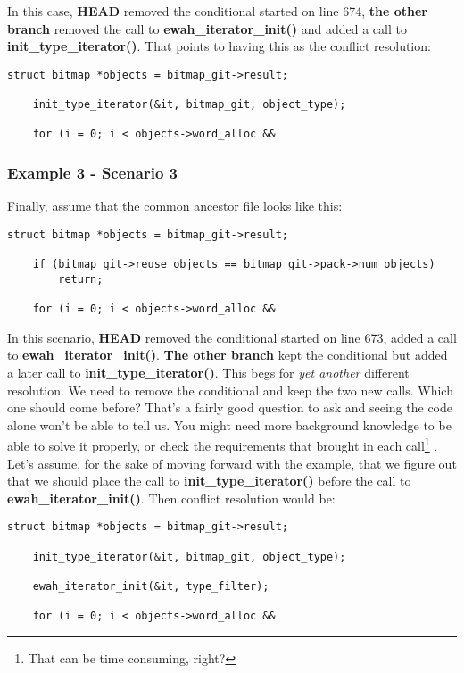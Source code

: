 In this case, {\bf HEAD} removed the conditional started on line 674, {\bf the other branch} removed the call to
{\bf ewah\_iterator\_init()} and added a call to {\bf init\_type\_iterator()}. That points to having this as the conflict resolution:

\begin{lstlisting}[style=c_style, firstnumber=671, caption={\bf example 3} - Scenario 2 - conflict resolution]
	struct bitmap *objects = bitmap_git->result;

	init_type_iterator(&it, bitmap_git, object_type);

	for (i = 0; i < objects->word_alloc &&
\end{lstlisting}

\subsubsection{Example 3 - Scenario 3}
Finally, assume that the common ancestor file looks like this:

\begin{lstlisting}[style=c_style, firstnumber=671, caption={\bf example 3} - Scenario 3 - common ancestor code]
	struct bitmap *objects = bitmap_git->result;

	if (bitmap_git->reuse_objects == bitmap_git->pack->num_objects)
		return;

	for (i = 0; i < objects->word_alloc &&
\end{lstlisting}

In this scenario, {\bf HEAD} removed the conditional started on line 673, added a call to {\bf ewah\_iterator\_init()}.
{\bf The other branch} kept the conditional but added a later call to {\bf init\_type\_iterator()}. This begs for {\it yet another}
different resolution. We need to remove the conditional and keep the two new calls. Which one should come before? That's
a fairly good question to ask and seeing the code alone won't be able to tell us. You might need more background knowledge
to be able to solve it properly, or check the requirements that brought in each call\footnote{That can be time consuming, right?}
. Let's assume, for the sake of moving forward with the example, that we figure out that we should place the call
to {\bf init\_type\_iterator()} before the call to {\bf ewah\_iterator\_init()}. Then conflict resolution would be:

\begin{lstlisting}[style=c_style, firstnumber=671, caption={\bf example 3} - Scenario 3 - conflict resolution]
	struct bitmap *objects = bitmap_git->result;

	init_type_iterator(&it, bitmap_git, object_type);

	ewah_iterator_init(&it, type_filter);

	for (i = 0; i < objects->word_alloc &&
\end{lstlisting}

